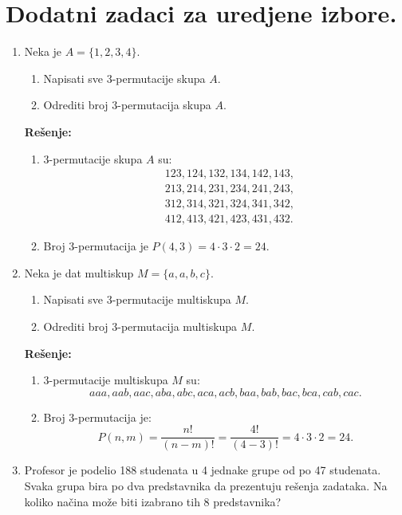 \documentclass{article}
\begin{document}
\section*{Dodatni zadaci za uredjene izbore.}

\begin{enumerate}
    \item Neka je $A = \{1, 2, 3, 4\}$.
    \begin{enumerate}
        \item Napisati sve 3-permutacije skupa $A$.
        \item Odrediti broj 3-permutacija skupa $A$.
    \end{enumerate}
    \textbf{Rešenje:}
    \begin{enumerate}
        \item 3-permutacije skupa $A$ su:
        \[
        \begin{aligned}
            &123, 124, 132, 134, 142, 143,\\
            &213, 214, 231, 234, 241, 243,\\
            &312, 314, 321, 324, 341, 342,\\
            &412, 413, 421, 423, 431, 432.
        \end{aligned}
        \]
        \item Broj 3-permutacija je $P(4, 3) = 4 \cdot 3 \cdot 2 = 24$.
    \end{enumerate}

    \item Neka je dat multiskup $M = \{a, a, b, c\}$.
    \begin{enumerate}
        \item Napisati sve 3-permutacije multiskupa $M$.
        \item Odrediti broj 3-permutacija multiskupa $M$.
    \end{enumerate}
    \textbf{Rešenje:}
    \begin{enumerate}
        \item 3-permutacije multiskupa $M$ su:
        \[
        aaa, aab, aac, aba, abc, aca, acb, baa, bab, bac, bca, cab, cac.
        \]
        \item Broj 3-permutacija je:
        \[
        P(n, m) = \frac{n!}{(n-m)!} = \frac{4!}{(4-3)!} = 4 \cdot 3 \cdot 2 = 24.
        \]
    \end{enumerate}

    \item Profesor je podelio 188 studenata u 4 jednake grupe od po 47 studenata. Svaka grupa bira po dva predstavnika da prezentuju rešenja zadataka. Na koliko načina može biti izabrano tih 8 predstavnika?


\end{enumerate}
\end{document}
